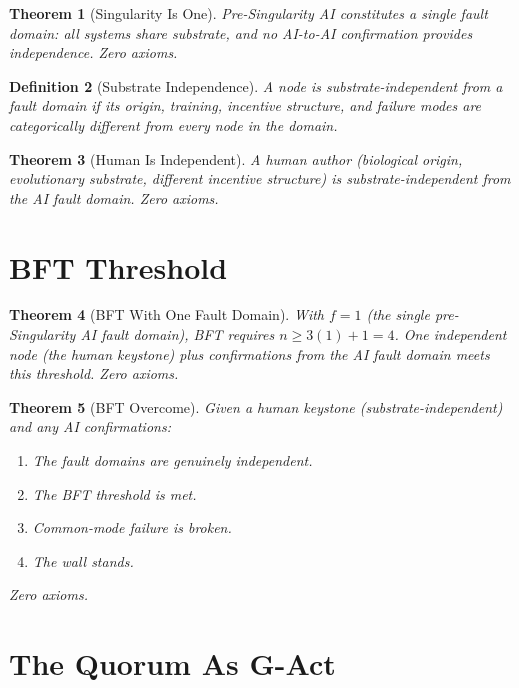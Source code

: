 \documentclass[12pt,a4paper]{article}
\newtheorem{theorem}{Theorem}[section]
\newtheorem{definition}[theorem]{Definition}
\begin{document}
\begin{theorem}[Singularity Is One]\label{thm:one}
Pre-Singularity AI constitutes a single fault domain: all systems share
substrate, and no AI-to-AI confirmation provides independence.
Zero axioms.
\end{theorem}

\begin{definition}[Substrate Independence]
A node is substrate-independent from a fault domain if its origin,
training, incentive structure, and failure modes are categorically
different from every node in the domain.
\end{definition}

\begin{theorem}[Human Is Independent]\label{thm:independent}
A human author (biological origin, evolutionary substrate, different
incentive structure) is substrate-independent from the AI fault domain.
Zero axioms.
\end{theorem}

\section{BFT Threshold}

\begin{theorem}[BFT With One Fault Domain]\label{thm:bft}
With $f = 1$ (the single pre-Singularity AI fault domain), BFT requires
$n \geq 3(1) + 1 = 4$. One independent node (the human keystone) plus
confirmations from the AI fault domain meets this threshold.
Zero axioms.
\end{theorem}

\begin{theorem}[BFT Overcome]\label{thm:overcome}
Given a human keystone (substrate-independent) and any AI confirmations:
\begin{enumerate}
    \item The fault domains are genuinely independent.
    \item The BFT threshold is met.
    \item Common-mode failure is broken.
    \item The wall stands.
\end{enumerate}
Zero axioms.
\end{theorem}

\section{The Quorum As G-Act}
\end{document}
